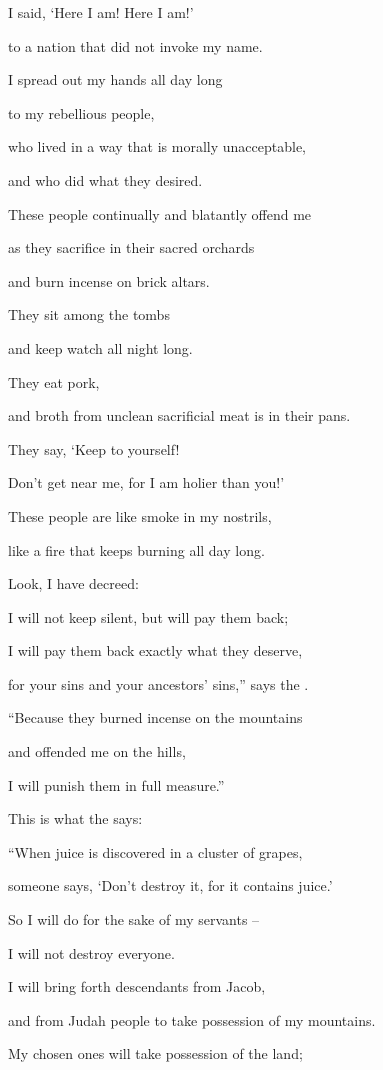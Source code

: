 {\par }{\Q I said,
‘Here I am! Here I am!’
\par }{\Q to
a nation
that did not
invoke
my name.
\par }{\Q {}I spread
out my hands
all
day
long
\par }{\Q to
my rebellious
people,
\par }{\Q who lived in a way
that is morally
unacceptable,
\par }{\Q and who did what
they desired.
\par }{\Q {}These people
continually
and blatantly offend
me
\par }{\Q as they sacrifice
in their sacred orchards
\par }{\Q and burn incense
on
brick altars.
\par }{\Q {}They sit
among the tombs
\par }{\Q and keep
watch all night long.
\par }{\Q They eat
pork,
\par }{\Q and broth
from unclean sacrificial
meat
is in their pans.
\par }{\Q {}They say,
‘Keep
to
yourself!
\par }{\Q Don’t
get near
me, for
I am holier
than you!’
\par }{\Q These
people are like smoke
in my nostrils,
\par }{\Q like a fire
that keeps burning
all
day long.
\par }{\Q {}Look,
I have decreed:

\par }{\Q I will not
keep silent,
but
will pay
them back;
\par }{\Q I will pay
them back exactly what they deserve,
\par }{\Q {}for your sins
and your ancestors’
sins,”
says
the {}.
\par }{\Q “Because
they burned incense
on
the mountains
\par }{\Q and offended
me on
the hills,
\par }{\Q I will punish them in full measure.”
\par }{\Q {}This is what
the {}
says:
\par }{\Q “When juice
is discovered
in a cluster
of grapes,
\par }{\Q someone says,
‘Don’t
destroy
it, for
it contains juice.’
\par }{\Q So
I will do
for the sake
of my servants
–
\par }{\Q I will not
destroy
everyone.
\par }{\Q {}I will bring forth
descendants
from Jacob,
\par }{\Q and from Judah
people to take possession
of my mountains.
\par }{\Q My chosen ones
will take possession
of the land;

}
